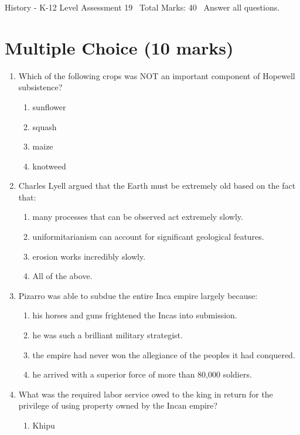 \documentclass[12pt]{article}
\begin{document}
\begin{center}
History - K-12 Level Assessment 19 \
Total Marks: 40 \
Answer all questions.
\end{center}

\section*{Multiple Choice (10 marks)}
\begin{enumerate}[label=\arabic*.]
\item Which of the following crops was NOT an important component of Hopewell subsistence?
\begin{enumerate}[label=(\alph*)]
    \item sunflower
    \item squash
    \item maize
    \item knotweed
\end{enumerate}
\item Charles Lyell argued that the Earth must be extremely old based on the fact that:
\begin{enumerate}[label=(\alph*)]
    \item many processes that can be observed act extremely slowly.
    \item uniformitarianism can account for significant geological features.
    \item erosion works incredibly slowly.
    \item All of the above.
\end{enumerate}
\item Pizarro was able to subdue the entire Inca empire largely because:
\begin{enumerate}[label=(\alph*)]
    \item his horses and guns frightened the Incas into submission.
    \item he was such a brilliant military strategist.
    \item the empire had never won the allegiance of the peoples it had conquered.
    \item he arrived with a superior force of more than 80,000 soldiers.
\end{enumerate}
\item What was the required labor service owed to the king in return for the privilege of using property owned by the Incan empire?
\begin{enumerate}[label=(\alph*)]
    \item Khipu

\end{enumerate}
\end{enumerate}
\end{document}
